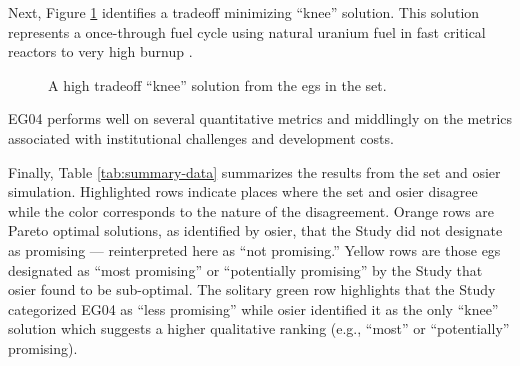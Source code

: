 

Next, Figure \ref{fig:single-eg-set-space} identifies a tradeoff minimizing
``knee'' solution. This solution represents a once-through fuel cycle using
natural uranium fuel in fast critical reactors to very high burnup
\cite{wigeland_nuclear_2014-2}.

\begin{figure}[htbp!]
  \centering
  \resizebox{0.85\columnwidth}{!}{}
  \caption{A high tradeoff ``knee'' solution from the \acp{eg} in the \ac{set}.}
  \label{fig:single-eg-set-space}
\end{figure}

\noindent
EG04 performs well on several quantitative metrics and middlingly on the metrics associated 
with institutional challenges and development costs.

\FloatBarrier

\noindent
Finally, Table \ref{tab:summary-data} summarizes the results from the \ac{set} and
\ac{osier} simulation. Highlighted rows indicate places where the \ac{set} and \ac{osier}
disagree while the color corresponds to the nature of the disagreement. Orange rows are
Pareto optimal solutions, as identified by \ac{osier}, that the Study did not designate as promising ---
reinterpreted here as ``not promising.'' Yellow rows are those \acp{eg} designated as ``most promising''
or ``potentially promising'' by the Study that \ac{osier} found to be sub-optimal. The solitary green row
highlights that the Study categorized EG04 as ``less promising'' while \ac{osier} identified it as the 
only ``knee'' solution which suggests a higher qualitative ranking (e.g., ``most'' or ``potentially'' promising). 


